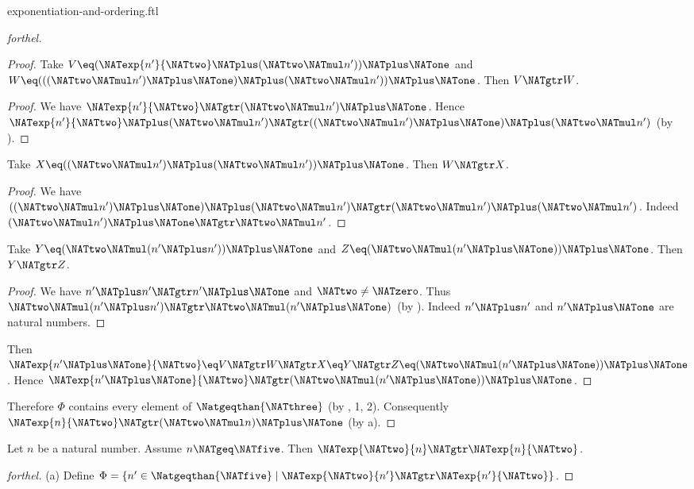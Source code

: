 \documentclass{naproche-library}
\begin{document}
\begin{smodule}[title=Exponentiation and Ordering]{exponentiation-and-ordering.ftl}
\begin{proof}[forthel]
\begin{proof}
    Take $V \eq (\NATexp{n'}{\NATtwo} \NATplus (\NATtwo \NATmul n')) \NATplus \NATone$ and $W \eq (((\NATtwo \NATmul n') \NATplus \NATone) \NATplus (\NATtwo \NATmul n')) \NATplus \NATone$.
    Then $V \NATgtr W$.
    \begin{proof}
      We have $\NATexp{n'}{\NATtwo} \NATgtr (\NATtwo \NATmul n') \NATplus \NATone$.
      Hence $\NATexp{n'}{\NATtwo} \NATplus (\NATtwo \NATmul n') \NATgtr ((\NATtwo \NATmul n') \NATplus \NATone) \NATplus (\NATtwo \NATmul n')$ (by ).
    \end{proof}

    Take $X \eq ((\NATtwo \NATmul n') \NATplus (\NATtwo \NATmul n')) \NATplus \NATone$.
    Then $W \NATgtr X$.
    \begin{proof}
      We have $((\NATtwo \NATmul n') \NATplus \NATone) \NATplus (\NATtwo \NATmul n') \NATgtr (\NATtwo \NATmul n') \NATplus (\NATtwo \NATmul n')$.
      Indeed $(\NATtwo \NATmul n') \NATplus \NATone \NATgtr \NATtwo \NATmul n'$.
    \end{proof}

    Take $Y \eq (\NATtwo \NATmul (n' \NATplus n')) \NATplus \NATone$ and $Z \eq (\NATtwo \NATmul (n' \NATplus \NATone)) \NATplus \NATone$.
    Then $Y \NATgtr Z$.
    \begin{proof}
      We have $n' \NATplus n' \NATgtr n' \NATplus \NATone$ and $\NATtwo \neq \NATzero$.
      Thus $\NATtwo \NATmul (n' \NATplus n') \NATgtr \NATtwo \NATmul (n' \NATplus \NATone)$ (by ).
      Indeed $n' \NATplus n'$ and $n' \NATplus \NATone$ are natural numbers.
    \end{proof}

    Then $\NATexp{n' \NATplus \NATone}{\NATtwo} \eq V \NATgtr W \NATgtr X \eq Y \NATgtr Z \eq (\NATtwo \NATmul (n' \NATplus \NATone)) \NATplus \NATone$.
    Hence $\NATexp{n' \NATplus \NATone}{\NATtwo} \NATgtr (\NATtwo \NATmul (n' \NATplus \NATone)) \NATplus \NATone$.
  \end{proof}

  Therefore $\Phi$ contains every element of $\Natgeqthan{\NATthree}$ (by , 1, 2).
  Consequently $\NATexp{n}{\NATtwo} \NATgtr (\NATtwo \NATmul n) \NATplus \NATone$ (by a).
\end{proof}

\begin{proposition}[forthel,id=ARITHMETIC_09_1097950367318016]
  Let $n$ be a natural number.
  Assume $n \NATgeq \NATfive$.
  Then $\NATexp{\NATtwo}{n} \NATgtr \NATexp{n}{\NATtwo}$.
\end{proposition}
\begin{proof}[forthel]
  (a) Define $\Phi = \{ n' \in \Natgeqthan{\NATfive} \mid \NATexp{\NATtwo}{n'} \NATgtr \NATexp{n'}{\NATtwo} \}$.


\end{proof}
\end{smodule}
\end{document}
